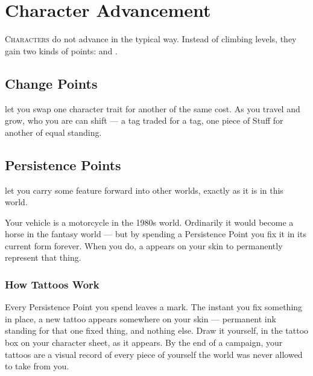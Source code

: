 \renewcommand{\realmaccent}{atrAccent}  %
\chapter{Character Advancement}
\begin{readaloud}
\lipsum[48][1-3]
\end{readaloud}

\lettrine{C}{haracters} do not advance in the typical way. Instead of
climbing levels, they gain two kinds of points: 
and .


\section{Change Points}
 let you swap one character trait for another of the
same cost. As you travel and grow, who you are can shift --- a tag traded
for a tag, one piece of Stuff for another of equal standing.

\section{Persistence Points}
 let you carry some feature forward into other
worlds, exactly as it is in this world.

\begin{example}
Your vehicle is a motorcycle in the 1980s world. Ordinarily it would become
a horse in the fantasy world --- but by spending a Persistence Point you fix
it in its current form forever. When you do, a  appears on
your skin to permanently represent that thing.
\end{example}

\subsection*{How Tattoos Work}
Every Persistence Point you spend leaves a mark. The instant you fix
something in place, a new tattoo appears somewhere on your skin ---
permanent ink standing for that one fixed thing, and nothing else. Draw
it yourself, in the tattoo box on your character sheet, as it appears.
By the end of a campaign, your tattoos are a visual record of every
piece of yourself the world was never allowed to take from you.

